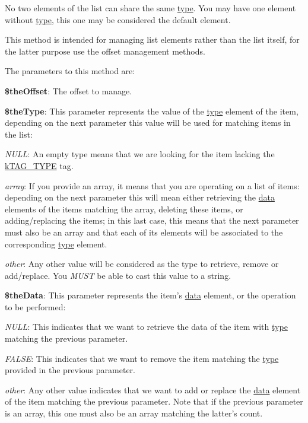 No two elements of the list can share the same \hyperlink{}{type}. You may have one element without \hyperlink{}{type}, this one may be considered the default element.

This method is intended for managing list elements rather than the list itself, for the latter purpose use the offset management methods.

The parameters to this method are\-:


\begin{DoxyItemize}
\item {\bfseries \$the\-Offset}\-: The offset to manage. 
\item {\bfseries \$the\-Type}\-: This parameter represents the value of the \hyperlink{}{type} element of the item, depending on the next parameter this value will be used for matching items in the list\-: 
\begin{DoxyItemize}
\item {\itshape N\-U\-L\-L\/}\-: An empty type means that we are looking for the item lacking the \hyperlink{}{k\-T\-A\-G\-\_\-\-T\-Y\-P\-E} tag. 
\item {\itshape array\/}\-: If you provide an array, it means that you are operating on a list of items\-: depending on the next parameter this will mean either retrieving the \hyperlink{}{data} elements of the items matching the array, deleting these items, or adding/replacing the items; in this last case, this means that the next parameter must also be an array and that each of its elements will be associated to the corresponding \hyperlink{}{type} element. 
\item {\itshape other\/}\-: Any other value will be considered as the type to retrieve, remove or add/replace. You {\itshape M\-U\-S\-T\/} be able to cast this value to a string. 
\end{DoxyItemize}
\item {\bfseries \$the\-Data}\-: This parameter represents the item's \hyperlink{}{data} element, or the operation to be performed\-: 
\begin{DoxyItemize}
\item {\itshape N\-U\-L\-L\/}\-: This indicates that we want to retrieve the data of the item with \hyperlink{}{type} matching the previous parameter. 
\item {\itshape F\-A\-L\-S\-E\/}\-: This indicates that we want to remove the item matching the \hyperlink{}{type} provided in the previous parameter. 
\item {\itshape other\/}\-: Any other value indicates that we want to add or replace the \hyperlink{}{data} element of the item matching the previous parameter. Note that if the previous parameter is an array, this one must also be an array matching the latter's count. 

\end{DoxyItemize}
\end{DoxyItemize}

